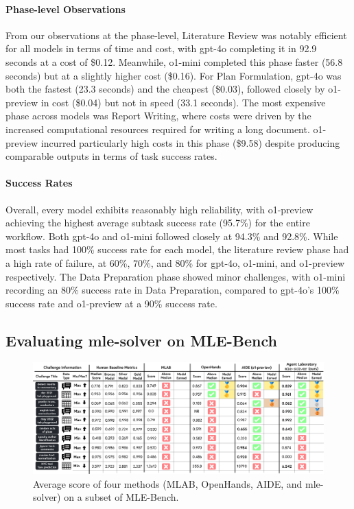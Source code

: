 \documentclass[11pt, a4paper]{gdm_format}
\begin{document}
\paragraph{Phase-level Observations} From our observations at the phase-level, Literature Review was notably efficient for all models in terms of time and cost, with gpt-4o completing it in 92.9 seconds at a cost of \$0.12. Meanwhile, o1-mini completed this phase faster (56.8 seconds) but at a slightly higher cost (\$0.16). For Plan Formulation, gpt-4o was both the fastest (23.3 seconds) and the cheapest (\$0.03), followed closely by o1-preview in cost (\$0.04) but not in speed (33.1 seconds). The most expensive phase across models was Report Writing, where costs were driven by the increased computational resources required for writing a long document. o1-preview incurred particularly high costs in this phase (\$9.58) despite producing comparable outputs in terms of task success rates.

\paragraph{Success Rates}
Overall, every model exhibits reasonably high reliability, with o1-preview achieving the highest average subtask success rate (95.7\%) for the entire workflow. Both gpt-4o and o1-mini followed closely at 94.3\% and 92.8\%. While most tasks had 100\% success rate for each model, the literature review phase had a high rate of failure, at 60\%, 70\%, and 80\% for gpt-4o, o1-mini, and o1-preview respectively. The Data Preparation phase showed minor challenges, with o1-mini recording an 80\% success rate in Data Preparation, compared to gpt-4o’s 100\% success rate and o1-preview at a 90\% success rate.




\subsection{Evaluating mle-solver on MLE-Bench}


\begin{figure}
    \centering
    \includegraphics[width=0.99\linewidth]{images/pngs/mlebench_graph.png}
    \caption{Average score of four methods (MLAB, OpenHands, AIDE, and mle-solver) on a subset of MLE-Bench.}%
    \label{fig:mle-bench-eval}
\end{figure}
\end{document}
